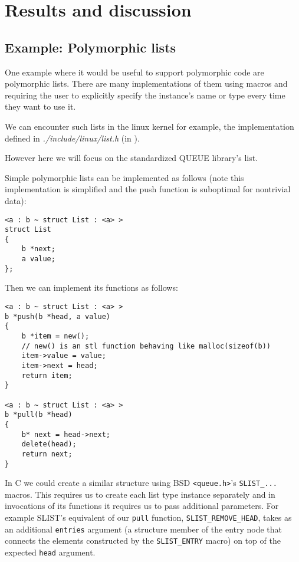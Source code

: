 
\chapter{Results and discussion}

\section{Example: Polymorphic lists}

One example where it would be useful to support polymorphic code are polymorphic lists. There are many implementations of them using macros and requiring the user to explicitly specify the instance's name or type every time they want to use it.

We can encounter such lists in the linux kernel for example, the implementation defined in \emph{./include/linux/list.h} (in \cite{torvalds2018linux}).

However here we will focus on the standardized QUEUE library's list.

Simple polymorphic lists can be implemented as follows (note this implementation is simplified and the push function is suboptimal for nontrivial data):

\begin{lstlisting}
<a : b ~ struct List : <a> >
struct List
{
    b *next;
    a value;
};
\end{lstlisting}

Then we can implement its functions as follows:

\begin{lstlisting}
<a : b ~ struct List : <a> >
b *push(b *head, a value)
{
    b *item = new();
    // new() is an stl function behaving like malloc(sizeof(b))
    item->value = value;
    item->next = head;
    return item;
}

<a : b ~ struct List : <a> >
b *pull(b *head)
{
    b* next = head->next;
    delete(head);
    return next;
}
\end{lstlisting}

In C we could create a similar structure using BSD \lstinline{<queue.h>}'s \cite{pages2007queue} \lstinline{SLIST_...} macros. This requires us to create each list type instance separately and in invocations of its functions it requires us to pass additional parameters. For example SLIST's equivalent of our \lstinline{pull} function, \lstinline{SLIST_REMOVE_HEAD}, takes as an additional \lstinline{entries} argument (a structure member of the entry node that connects the elements constructed by the \lstinline{SLIST_ENTRY} macro) on top of the expected \lstinline{head} argument.

